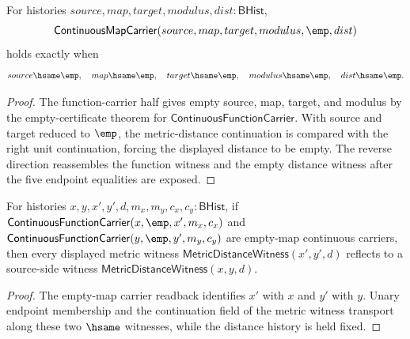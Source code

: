 \begin{theorem}
\label{thm:continuousmap-carrier-empty-cert-exactness}
For histories $source,map,target,modulus,dist:\mathsf{BHist}$,
$$
\mathsf{ContinuousMapCarrier}(source,map,target,modulus,\emp,dist)
$$
holds exactly when
$$
source \hsame \emp,\quad map \hsame \emp,\quad target \hsame \emp,\quad
modulus \hsame \emp,\quad dist \hsame \emp .
$$
\end{theorem}
\begin{proof}
The function-carrier half gives empty source, map, target, and modulus by the
empty-certificate theorem for $\mathsf{ContinuousFunctionCarrier}$. With source
and target reduced to $\emp$, the metric-distance continuation is compared with
the right unit continuation, forcing the displayed distance to be empty. The
reverse direction reassembles the function witness and the empty distance
witness after the five endpoint equalities are exposed.
\end{proof}

\begin{theorem}
\label{thm:continuousmap-empty-identity-metric-witness-reflects}
For histories $x,y,x',y',d,m_x,m_y,c_x,c_y:\mathsf{BHist}$, if
$\mathsf{ContinuousFunctionCarrier}(x,\emp,x',m_x,c_x)$ and
$\mathsf{ContinuousFunctionCarrier}(y,\emp,y',m_y,c_y)$ are empty-map
continuous carriers, then every displayed metric witness
$\mathsf{MetricDistanceWitness}(x',y',d)$ reflects to a source-side witness
$\mathsf{MetricDistanceWitness}(x,y,d)$.
\end{theorem}
\begin{proof}
The empty-map carrier readback identifies $x'$ with $x$ and $y'$ with $y$.
Unary endpoint membership and the continuation field of the metric witness
transport along these two $\hsame$ witnesses, while the distance history is
held fixed.
\end{proof}

